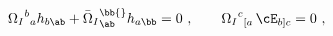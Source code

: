 \begin{equation}
 {\Omega_I}^b{}_a h_{b\ab} + \bar{\Omega}_I{}^\bb{}_\ab h_{a\bb} = 0\
 ,\qquad {\Omega_I}^c{}_{[a}\, \cE_{b]c} = 0\ ,
 \end{equation}

